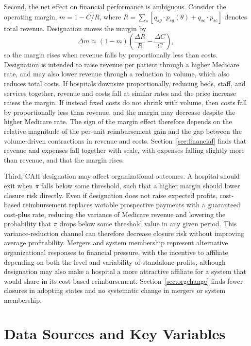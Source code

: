 \documentclass[a4paper, 12pt, twoside]{article}
\begin{document}
Second, the net effect on financial performance is ambiguous. Consider the operating margin, $m = 1 - C/R$, where $R = \sum_{s} \left[ q_{sg} \cdot p_{sg}(\theta) + q_{sc} \cdot p_{sc} \right]$ denotes total revenue. Designation moves the margin by
\begin{equation*}
\Delta m \approx (1 - m) \left( \frac{\Delta R}{R} - \frac{\Delta C}{C} \right),
\end{equation*}
so the margin rises when revenue falls by proportionally less than costs. Designation is intended to raise revenue per patient through a higher Medicare rate, and may also lower revenue through a reduction in volume, which also reduces total costs. If hospitals downsize proportionally, reducing beds, staff, and services together, revenue and costs fall at similar rates and the price increase raises the margin. If instead fixed costs do not shrink with volume, then costs fall by proportionally less than revenue, and the margin may decrease despite the higher Medicare rate. The sign of the margin effect therefore depends on the relative magnitude of the per-unit reimbursement gain and the gap between the volume-driven contractions in revenue and costs. Section~\ref{sec:financial} finds that revenue and expenses fall together with scale, with expenses falling slightly more than revenue, and that the margin rises.

Third, CAH designation may affect organizational outcomes. A hospital should exit when $\pi$ falls below some threshold, such that a higher margin should lower closure risk directly. Even if designation does not raise expected profits, cost-based reimbursement replaces variable prospective payments with a guaranteed cost-plus rate, reducing the variance of Medicare revenue and lowering the probability that $\pi$ drops below some threshold value in any given period. This variance-reduction channel can therefore decrease closure risk without improving average profitability. Mergers and system membership represent alternative organizational responses to financial pressure, with the incentive to affiliate depending on both the level and variability of standalone profits, although designation may also make a hospital a more attractive affiliate for a system that would share in its cost-based reimbursement. Section~\ref{sec:orgchange} finds fewer closures in adopting states and no systematic change in mergers or system membership.

\section{Data Sources and Key Variables}
\label{sec:data}
\end{document}
